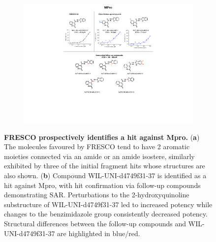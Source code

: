 \begin{figure}[!ph]
 \begin{subfigure}{\textwidth}
 \centering
 \includegraphics[width=0.75\linewidth]{Chapters/Fresco/Figs/mpro_hit_IC50.pdf}
 \end{subfigure}
 \caption{\textbf{FRESCO prospectively identifies a hit against Mpro.} (\textbf{a}) The molecules favoured by FRESCO tend to have 2 aromatic moieties connected via an amide or an amide isostere, similarly exhibited by three of the initial fragment hits whose structures are also shown. (\textbf{b}) Compound WIL-UNI-d4749f31-37 is identified as a hit against Mpro, with hit confirmation via follow-up compounds demonstrating SAR. Perturbations to the 2-hydroxyquinoline substructure of WIL-UNI-d4749f31-37 led to increased potency while changes to the benzimidazole group consistently decreased potency. Structural differences between the follow-up compounds and WIL-UNI-d4749f31-37 are highlighted in blue/red.}
 \label{fig:mpro_results}
\end{figure}



